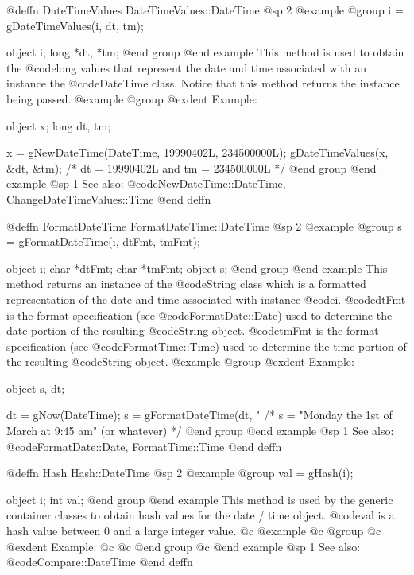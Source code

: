 @deffn {DateTimeValues} DateTimeValues::DateTime
@sp 2
@example
@group
i = gDateTimeValues(i, dt, tm);

object  i;
long    *dt, *tm;
@end group
@end example
This method is used to obtain the @code{long} values that represent
the date and time associated with an instance the @code{DateTime} class.
Notice that this method returns the instance being passed.  
@example
@group
@exdent Example:

object  x;
long    dt, tm;

x = gNewDateTime(DateTime, 19990402L, 234500000L);
gDateTimeValues(x, &dt, &tm);
/*  dt = 19990402L and tm = 234500000L  */
@end group
@end example
@sp 1
See also:  @code{NewDateTime::DateTime, ChangeDateTimeValues::Time}
@end deffn










@deffn {FormatDateTime} FormatDateTime::DateTime
@sp 2
@example
@group
s = gFormatDateTime(i, dtFmt, tmFmt);

object  i;
char    *dtFmt;
char    *tmFmt;
object  s;
@end group
@end example
This method returns an instance of the @code{String} class which is a
formatted representation of the date and time associated with instance
@code{i}.  @code{dtFmt} is the format specification (see @code{FormatDate::Date})
used to determine the date portion of the resulting @code{String} object.
@code{tmFmt} is the format specification (see @code{FormatTime::Time})
used to determine the time portion of the resulting @code{String} object.
@example
@group
@exdent Example:

object  s, dt;

dt = gNow(DateTime);
s = gFormatDateTime(dt, "%
/*  s = "Monday the 1st of March at 9:45 am" (or whatever)  */
@end group
@end example
@sp 1
See also:  @code{FormatDate::Date, FormatTime::Time}
@end deffn








@deffn {Hash} Hash::DateTime
@sp 2
@example
@group
val = gHash(i);

object  i;
int     val;
@end group
@end example
This method is used by the generic container classes to obtain hash values
for the date / time object.  @code{val} is a hash value between 0 and a large
integer value.
@c @example
@c @group
@c @exdent Example:
@c
@c @end group
@c @end example
@sp 1
See also:  @code{Compare::DateTime}
@end deffn











